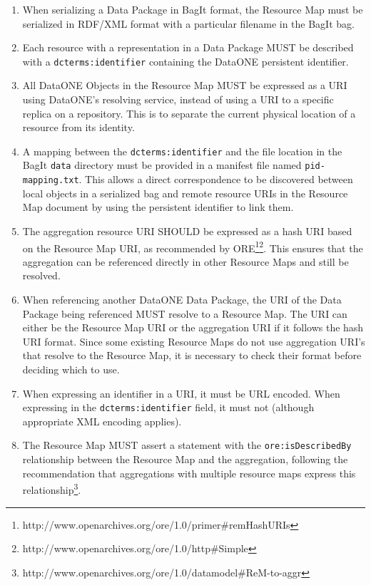 \documentclass[conference]{IEEEtran}
\begin{document}
\begin{enumerate}
  \item{When serializing a Data Package in BagIt format, the Resource Map must be serialized in RDF/XML format with a particular filename in the BagIt bag.}
  \item{Each resource with a representation in a Data Package MUST be described with a \texttt{dcterms:identifier} containing the DataONE persistent identifier.}
  \item{All DataONE Objects in the Resource Map MUST be expressed as a URI using DataONE’s resolving service, instead of using a URI to a specific replica on a repository. This is to separate the current physical location of a resource from its identity.}
  \item{A mapping between the \texttt{dcterms:identifier} and the file location in the BagIt \texttt{data} directory must be provided in a manifest file named \texttt{pid-mapping.txt}. This allows a direct correspondence to be discovered between local objects in a serialized bag and remote resource URIs in the Resource Map document by using the persistent identifier to link them.}
  \item{The aggregation resource URI SHOULD be expressed as a hash URI based on the Resource Map URI, as recommended by ORE\footnote{http://www.openarchives.org/ore/1.0/primer\#remHashURIs}\footnote{http://www.openarchives.org/ore/1.0/http\#Simple}. This ensures that the aggregation can be referenced directly in other Resource Maps and still be resolved.}
  \item{When referencing another DataONE Data Package, the URI of the Data Package being referenced MUST resolve to a Resource Map. The URI can either be the Resource Map URI or the aggregation URI if it follows the hash URI format. Since some existing Resource Maps do not use aggregation URI’s that resolve to the Resource Map, it is necessary to check their format before deciding which to use.}
  \item{When expressing an identifier in a URI, it must be URL encoded. When expressing in the \texttt{dcterms:identifier} field, it must not (although appropriate XML encoding applies).}
  \item{The Resource Map MUST assert a statement with the \texttt{ore:isDescribedBy} relationship between the Resource Map and the aggregation, following the recommendation that aggregations with multiple resource maps express this relationship\footnote{http://www.openarchives.org/ore/1.0/datamodel\#ReM-to-aggr}.}
\end{enumerate}
\end{document}
